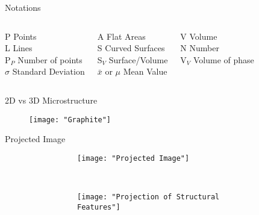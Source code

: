\documentclass[10pt]{beamer}
\begin{document}
\begin{frame}{Notations}


  \begin{columns}[T,onlytextwidth]
    P Points \\
    L Lines  \\
    P$ _{P} $ Number of points \\
    $\sigma$ Standard Deviation
 
   A Flat Areas \\
   S Curved Surfaces \\
   S$ _{V} $ Surface/Volume \\
   $\bar{x}$ or $\mu$ Mean Value
  
    V Volume \\
    N Number \\
    V$ _{V} $ Volume of phase
\end{columns}     

\end{frame}
{%
\begin{frame}[fragile]{2D vs 3D Microstructure}

\begin{figure}[H]
\texttt{[image: "Graphite"]}

\end{figure}
    
\end{frame}
}
{%
\begin{frame}[fragile]{Projected Image}

\begin{figure}[H]

\begin{figure}[H]
    \centering
    \begin{subfigure}[H]{0.40\textwidth}
        \texttt{[image: "Projected Image"]}
    \end{subfigure}
    ~
    \begin{subfigure}[H]{0.40\textwidth}
        \texttt{[image: "Projection of Structural Features"]}
    \end{subfigure}       
    
\end{figure}

\end{figure}
    
\end{frame}
}
\end{document}
